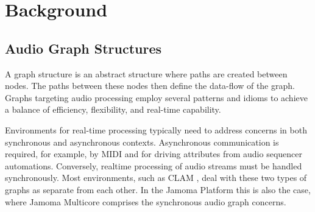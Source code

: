 \documentclass[twoside,a4paper]{article}
\begin{document}

%
%  
%





%
\section{Background} %
%



\subsection{Audio Graph Structures} %

A graph structure is an abstract structure where paths are created between nodes. %
The paths between these nodes then define the data-flow of the graph.  
Graphs targeting audio processing employ several patterns and idioms to achieve a balance of efficiency, flexibility, and real-time capability.

Environments for real-time processing typically need to address concerns in both synchronous and asynchronous contexts.  
Asynchronous communication is required, for example, by MIDI and for driving attributes from audio sequencer automations.  
Conversely, realtime processing of audio streams must be handled synchronously.  
Most environments, such as CLAM  \cite{Amatraian:2007}, deal with these two types of graphs as separate from each other.  
In the Jamoma Platform this is also the case, where Jamoma Multicore comprises the synchronous audio graph concerns.
\end{document}
